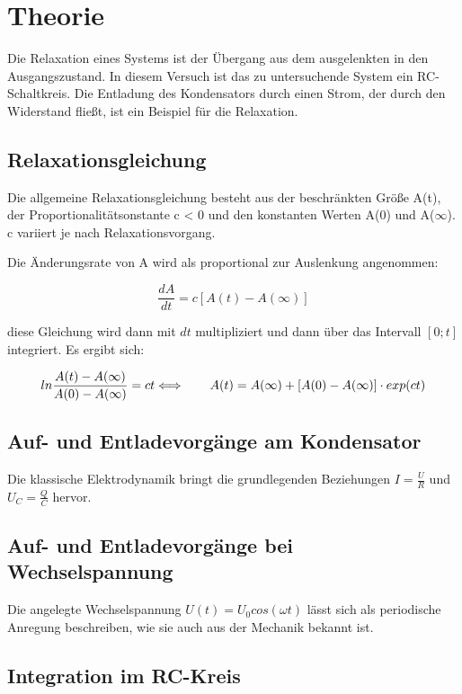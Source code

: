 \section{Theorie}
\label{sec:Theorie}

Die Relaxation eines Systems ist der Übergang aus dem ausgelenkten in den Ausgangszustand.
In diesem Versuch ist das zu untersuchende System ein RC-Schaltkreis.
Die Entladung des Kondensators durch einen Strom, der durch den Widerstand fließt, 
ist ein Beispiel für die Relaxation.

\subsection{Relaxationsgleichung}
\label{subsec:Die Relaxationsgleichung}

Die allgemeine Relaxationsgleichung besteht aus der beschränkten Größe A(t), der Proportionalitätsonstante c < 0 
und den konstanten
Werten A(0) und A($\infty$).
c variiert je nach Relaxationsvorgang.

Die Änderungsrate von A wird als proportional zur Auslenkung angenommen:

\begin{equation} \label{eq:Relaxation}

\frac{dA}{dt} = c[A(t)-A(\infty)]
    
\end{equation}

diese Gleichung wird dann mit $dt$ multipliziert und dann über das Intervall $[0; t]$ integriert. 
Es ergibt sich:

\begin{equation}
    
ln\frac{A(t)-A(\infty)}{A(0)-A(\infty)} = ct \\

\Longleftrightarrow\qquad A(t) = A(\infty) + [A(0)-A(\infty)] \cdot exp(ct)

\end{equation}


\subsection{Auf- und Entladevorgänge am Kondensator}
\label{subsec:Auf- und Entladevorgänge am Kondensator}

Die klassische Elektrodynamik bringt die grundlegenden Beziehungen $I = \frac{U}{R}$ und $U_C = \frac{Q}{C}$ 
hervor.

\subsection{Auf- und Entladevorgänge bei Wechselspannung}
\label{subsec:Auf- und Entladevorgänge bei Wechselspannung}

Die angelegte Wechselspannung $U(t) = U_0 cos(\omega t)$ lässt sich als periodische Anregung beschreiben, 
wie sie auch aus der Mechanik bekannt ist.



\subsection{Integration im RC-Kreis}
\label{subsec:Integration im RC-Kreis}


\cite{sample}
